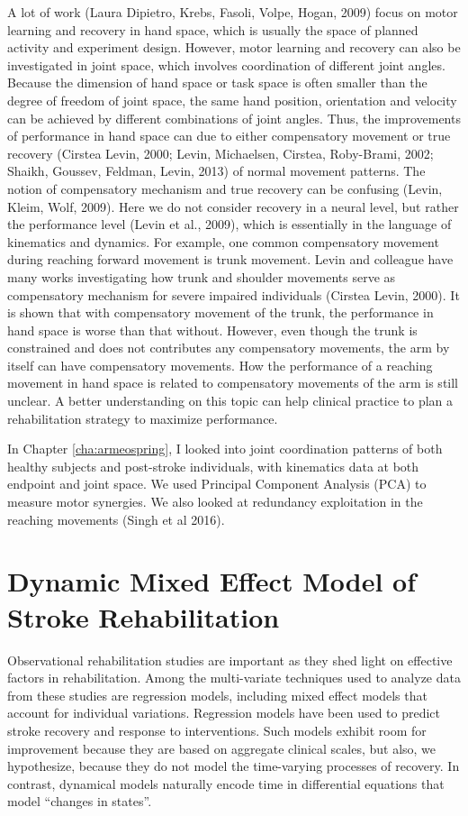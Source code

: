 A lot of work (Laura Dipietro, Krebs, Fasoli, Volpe,  Hogan, 2009) focus on motor learning and recovery in hand space, which is usually the space of planned activity and experiment design. 
However, motor learning and recovery can also be investigated in joint space, which involves coordination of different joint angles. 
Because the dimension of hand space or task space is often smaller than the degree of freedom of joint space, the same hand position, orientation and velocity can be achieved by different combinations of joint angles. 
Thus, the improvements of performance in hand space can due to either compensatory movement or true recovery (Cirstea  Levin, 2000; Levin, Michaelsen, Cirstea,  Roby-Brami, 2002; Shaikh, Goussev, Feldman,  Levin, 2013) of normal movement patterns.
The notion of compensatory mechanism and true recovery can be confusing (Levin, Kleim,  Wolf, 2009). 
Here we do not consider recovery in a neural level, but rather the performance level (Levin et al., 2009), which is essentially in the language of kinematics and dynamics. 
For example, one common compensatory movement during reaching forward movement is trunk movement. 
Levin and colleague have many works investigating how trunk and shoulder movements serve as compensatory mechanism for severe impaired individuals (Cirstea  Levin, 2000). 
It is shown that with compensatory movement of the trunk, the performance in hand space is worse than that without. 
However, even though the trunk is constrained and does not contributes any compensatory movements, the arm by itself can have compensatory movements. 
How the performance of a reaching movement in hand space is related to compensatory movements of the arm is still unclear. 
A better understanding on this topic can help clinical practice to plan a rehabilitation strategy to maximize performance.

In Chapter \ref{cha:armeospring}, I looked into joint coordination patterns of both healthy subjects and post-stroke individuals, with kinematics data at both endpoint and joint space. 
We used Principal Component Analysis (PCA) to measure motor synergies.
We also looked at redundancy exploitation in the reaching movements (Singh et al 2016).

\section{Dynamic Mixed Effect Model of Stroke Rehabilitation}
Observational rehabilitation studies are important as they shed light on effective factors in rehabilitation.
Among the multi-variate techniques used to analyze data from these studies are regression models, including mixed effect models that account for individual variations. 
Regression models have been used to predict stroke recovery 
 and response to interventions.
Such models exhibit room for improvement because they are based on aggregate clinical scales, but also, we hypothesize, because they do not model the time-varying processes of recovery. 
In contrast, dynamical models naturally encode time in differential equations that model “changes in states”. 

